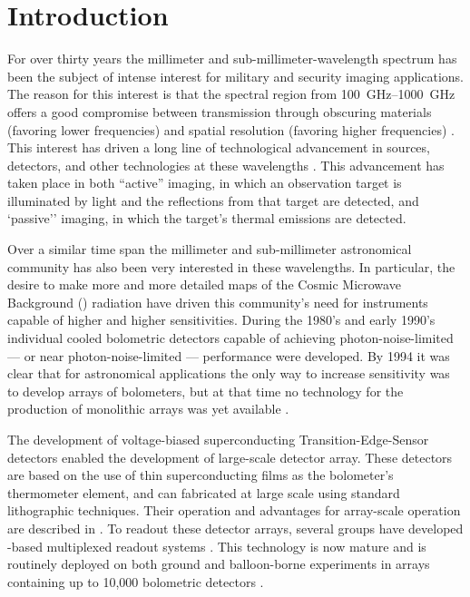 \chapter{Introduction} \label{c:intro}



For over thirty years the millimeter and sub-millimeter-wavelength spectrum has been the subject of intense interest for military and security imaging applications.
The reason for this interest is that the spectral region from \SIrange{100}{1000}{\GHz} offers a good compromise between transmission through obscuring materials (favoring lower frequencies) and spatial resolution (favoring higher frequencies) \cite{kruse_why_1981}.
This interest has driven a long line of technological advancement in sources, detectors, and other technologies at these wavelengths \cite{popovic_thz_2011}.
This advancement has taken place in both ``active'' imaging, in which an observation target is illuminated by light and the reflections from that target are detected, and `passive'' imaging, in which the target's thermal emissions are detected.

Over a similar time span the millimeter and sub-millimeter astronomical community has also been very interested in these wavelengths.
In particular, the desire to make more and more detailed maps of the Cosmic Microwave Background (\CMB) radiation have driven this community's need for instruments capable of higher and higher sensitivities.
During the 1980's and early 1990's individual cooled bolometric detectors capable of achieving photon-noise-limited --- or near photon-noise-limited --- performance were developed.
By 1994 it was clear that for astronomical applications the only way to increase sensitivity was to develop arrays of bolometers, but at that time no technology for the production of monolithic arrays was yet available \cite{richards_bolometers_1994}.

The development of voltage-biased superconducting Transition-Edge-Sensor detectors enabled the development of large-scale detector array.
These detectors are based on the use of thin superconducting films as the bolometer's thermometer element, and can fabricated at large scale using standard lithographic techniques.
Their operation and advantages for array-scale operation are described in .
To readout these detector arrays, several groups have developed \SQUID-based multiplexed readout systems \cite{tdm,berkeley fdm, europe}.
This technology is now mature and is routinely deployed on both ground and balloon-borne experiments in arrays containing up to 10,000 bolometric detectors \cite{holland_scuba-2:_2013}.

